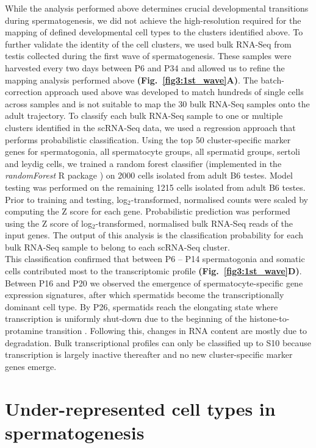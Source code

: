 While the analysis performed above determines crucial developmental transitions during spermatogenesis, we did not achieve the high-resolution required for the mapping of defined developmental cell types to the clusters identified above. 
To further validate the identity of the cell clusters, we used bulk RNA-Seq from testis collected during the first wave of spermatogenesis. 
These samples were harvested every two days between P6 and P34 and allowed us to refine the mapping analysis performed above \textbf{(Fig.~\ref{fig3:1st_wave}A)}. 
The batch-correction approach used above was developed to match hundreds of single cells across samples and is not suitable to map the 30 bulk RNA-Seq samples onto the adult trajectory. 
To classify each bulk RNA-Seq sample to one or multiple clusters identified in the scRNA-Seq data, we used a regression approach that performs probabilistic classification. 
Using the top 50 cluster-specific marker genes for spermatogonia, all spermatocyte groups, all spermatid groups, sertoli and leydig cells, we trained a random forest classifier (implemented in the \emph{randomForest} R package \citep{Liaw2002}) on 2000 cells isolated from adult B6 testes. 
Model testing was performed on the remaining 1215 cells isolated from adult B6 testes. Prior to training and testing, log$_2$-transformed, normalised counts were scaled by computing the Z score for each gene. 
Probabilistic prediction was performed using the Z score of log$_2$-transformed, normalised bulk RNA-Seq reads of the input genes. 
The output of this analysis is the classification probability for each bulk RNA-Seq sample to belong to each scRNA-Seq cluster.\\

This classification confirmed that between P6 – P14 spermatogonia and somatic cells contributed most to the transcriptomic profile \textbf{(Fig.~\ref{fig3:1st_wave}D)}. 
Between P16 and P20 we observed the emergence of spermatocyte-specific gene expression signatures, after which spermatids become the transcriptionally dominant cell type. 
By P26, spermatids reach the elongating state where transcription is uniformly shut-down due to the beginning of the histone-to-protamine transition \citep{Steger1999}. 
Following this, changes in RNA content are mostly due to degradation. 
Bulk transcriptional profiles can only be classified up to S10 because transcription is largely inactive thereafter and no new cluster-specific marker genes emerge.  

\newpage

\section{Under-represented cell types in spermatogenesis}


